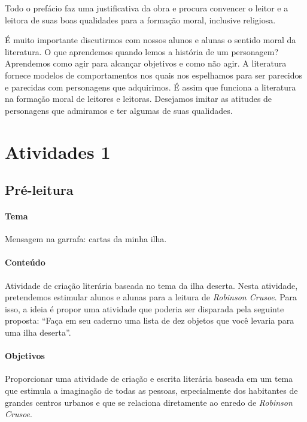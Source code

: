 \documentclass[12pt]{extarticle}
\begin{document}
Todo o prefácio faz uma justificativa da obra e procura convencer o
leitor e a leitora de suas boas qualidades para a formação moral,
inclusive religiosa.

É muito importante discutirmos com nossos alunos e alunas o sentido
moral da literatura. O que aprendemos quando lemos a história de um
personagem? Aprendemos como agir para alcançar objetivos e como não
agir. A literatura fornece modelos de comportamentos nos quais nos
espelhamos para ser parecidos e parecidas com personagens que
adquirimos. É assim que funciona a literatura na formação moral de
leitores e leitoras. Desejamos imitar as atitudes de personagens que
admiramos e ter algumas de suas qualidades.


\section{Atividades 1}


\subsection{Pré-leitura}


\paragraph{Tema} Mensagem na garrafa: cartas da minha ilha.

\paragraph{Conteúdo}
Atividade de criação literária baseada no tema da ilha deserta.
Nesta atividade, pretendemos estimular alunos e alunas para a leitura de
\emph{Robinson Crusoe}. Para isso, a ideia é propor uma atividade que
poderia ser disparada pela seguinte proposta: ``Faça em seu caderno uma
lista de dez objetos que você levaria para uma ilha deserta''.


\paragraph{Objetivos}
Proporcionar uma atividade de criação e escrita literária baseada em um
tema que estimula a imaginação de todas as pessoas, especialmente dos
habitantes de grandes centros urbanos e que se relaciona diretamente ao
enredo de \emph{Robinson Crusoe}.
\end{document}
